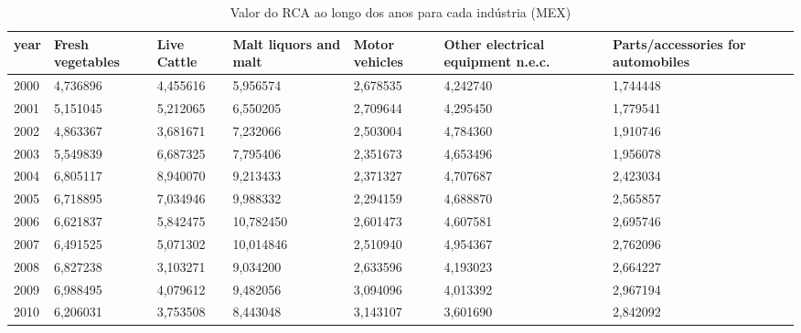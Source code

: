 \begin{table}
\centering
\caption{Valor do RCA ao longo dos anos para cada indústria (MEX)}
\begin{tabular}{p{1cm}p{2cm}p{2cm}p{2cm}p{2cm}p{2cm}p{2cm}}
\toprule
 year &  Fresh vegetables &  Live Cattle &  Malt liquors and malt &  Motor vehicles &  Other electrical equipment n.e.c. &  Parts/accessories for automobiles \\
\midrule
 2000 &          4,736896 &     4,455616 &               5,956574 &        2,678535 &                           4,242740 &                           1,744448 \\
 2001 &          5,151045 &     5,212065 &               6,550205 &        2,709644 &                           4,295450 &                           1,779541 \\
 2002 &          4,863367 &     3,681671 &               7,232066 &        2,503004 &                           4,784360 &                           1,910746 \\
 2003 &          5,549839 &     6,687325 &               7,795406 &        2,351673 &                           4,653496 &                           1,956078 \\
 2004 &          6,805117 &     8,940070 &               9,213433 &        2,371327 &                           4,707687 &                           2,423034 \\
 2005 &          6,718895 &     7,034946 &               9,988332 &        2,294159 &                           4,688870 &                           2,565857 \\
 2006 &          6,621837 &     5,842475 &              10,782450 &        2,601473 &                           4,607581 &                           2,695746 \\
 2007 &          6,491525 &     5,071302 &              10,014846 &        2,510940 &                           4,954367 &                           2,762096 \\
 2008 &          6,827238 &     3,103271 &               9,034200 &        2,633596 &                           4,193023 &                           2,664227 \\
 2009 &          6,988495 &     4,079612 &               9,482056 &        3,094096 &                           4,013392 &                           2,967194 \\
 2010 &          6,206031 &     3,753508 &               8,443048 &        3,143107 &                           3,601690 &                           2,842092 \\

\end{tabular}
\end{table}

